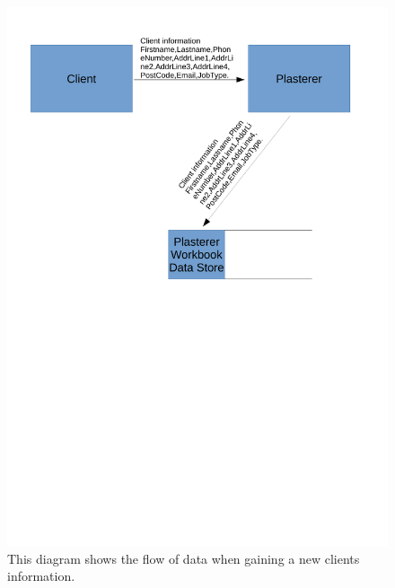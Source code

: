 \begin{figure}[H]
    \includegraphics[width=\textwidth]{./Analysis/images/ClientInformation.pdf}
    \caption{This diagram shows the flow of data when gaining a new clients information.} \label{fig:client_information_data_flow_diagram}
\end{figure}


